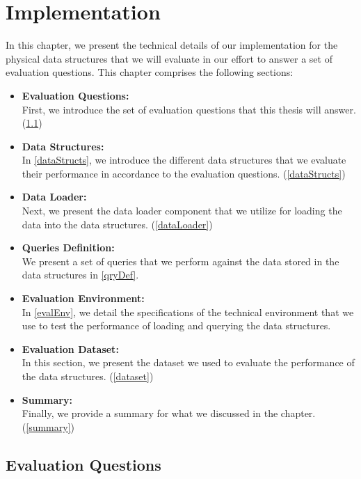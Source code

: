 {\chapter{Implementation}
\label{chap:Implementation}
In this chapter, we present the technical details of our implementation for the physical data structures that we will evaluate in our effort to answer a set of evaluation questions. This chapter comprises the following sections:


\begin{itemize}  
\item \textbf{Evaluation Questions:}\\
First, we introduce the set of evaluation questions that this thesis will answer. (\ref{evalQests})
\item\textbf{Data Structures:}\\
In \ref{dataStructs}, we introduce the different data structures that we evaluate their performance in accordance to the evaluation questions. (\ref{dataStructs})
\item \textbf{Data Loader:}\\
Next, we present the data loader component that we utilize for loading the data into the data structures. (\ref{dataLoader})
\item \textbf{Queries Definition:}\\
We present a set of queries that we perform against the data stored in the data structures in \ref{qryDef}.
\item \textbf{Evaluation Environment:}\\
In \ref{evalEnv}, we detail the specifications of the technical environment that we use to test the performance of loading and querying the data structures. 
\item \textbf{Evaluation Dataset:}\\
In this section, we present the dataset we used to evaluate the performance of the data structures. (\ref{dataset})
\item \textbf{Summary:}\\
Finally, we provide a summary for what we discussed in the chapter. (\ref{summary})
\end{itemize}
 
\section{Evaluation Questions}
\label{evalQests}


}
